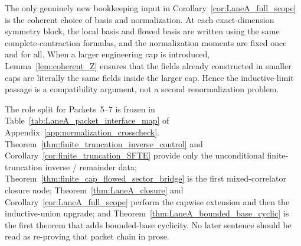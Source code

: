 \begin{remark}\label{rem:LaneA_inductive_compatibility}
The only genuinely new bookkeeping input in Corollary~\ref{cor:LaneA_full_scope} is the coherent choice of basis and normalization.
At each exact-dimension symmetry block, the local basis and flowed basis are written using the same complete-contraction formulas,
and the normalization moments are fixed once and for all.
When a larger engineering cap is introduced, Lemma~\ref{lem:coherent_Z} ensures that the fields already constructed in smaller caps are literally the same fields inside the larger cap.
Hence the inductive-limit passage is a compatibility argument, not a second renormalization problem.
\end{remark}

\begin{remark}
The role split for Packets~5--7 is frozen in Table~\ref{tab:LaneA_packet_interface_map} of Appendix~\ref{app:normalization_crosscheck}.
Theorem~\ref{thm:finite_truncation_inverse_control} and Corollary~\ref{cor:finite_truncation_SFTE} provide only the unconditional finite-truncation inverse / remainder data;
Theorem~\ref{thm:finite_cap_flowed_sector_bridge} is the first mixed-correlator closure node;
Theorem~\ref{thm:LaneA_closure} and Corollary~\ref{cor:LaneA_full_scope} perform the capwise extension and then the inductive-union upgrade;
and Theorem~\ref{thm:LaneA_bounded_base_cyclic} is the first theorem that adds bounded-base cyclicity.
No later sentence should be read as re-proving that packet chain in prose.
\end{remark}
